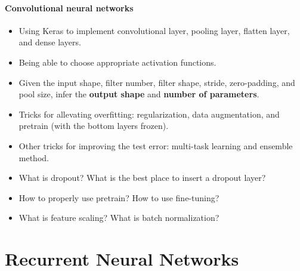 \documentclass[11pt]{article}
\numberwithin{equation}{section}
\begin{document}
\paragraph{Convolutional neural networks}

\begin{itemize}
	\item
	Using Keras to implement convolutional layer, pooling layer, flatten layer, and dense layers.
	\item
	Being able to choose appropriate activation functions.
	\item
	Given the input shape, filter number, filter shape, stride, zero-padding, and pool size, infer the \textbf{output shape } and \textbf{number of parameters}.
	\item
	Tricks for allevating overfitting: regularization, data augmentation, and pretrain (with the bottom layers frozen).
	\item
	Other tricks for improving the test error: multi-task learning and ensemble method.
	\item
	What is dropout? What is the best place to insert a dropout layer?
	\item
	How to properly use pretrain? How to use fine-tuning?
	\item
	What is feature scaling? What is batch normalization? 
\end{itemize}




\section{Recurrent Neural Networks}
\end{document}
